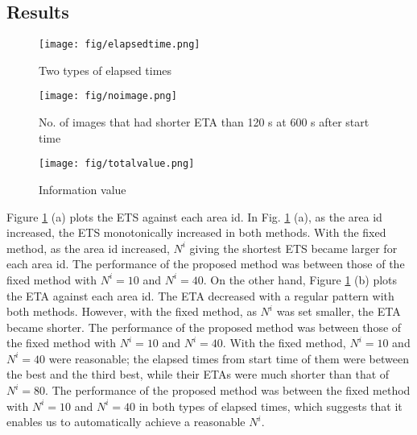 \documentclass{ieeeaccess}
\begin{document}
\subsection{Results}

\begin{figure}[t]
\begin{center}
\texttt{[image: fig/elapsedtime.png]}
\caption{Two types of elapsed times}
\label{elapsed}
\end{center}
\end{figure}

\begin{figure*}[t]
\begin{center}
\texttt{[image: fig/noimage.png]}
\caption{No. of images that had shorter ETA than 120 s at 600 s after start time}
\label{totalnumber}
\end{center}
\end{figure*}

\begin{figure*}[t]
\begin{center}
\texttt{[image: fig/totalvalue.png]}
\caption{Information value}
\label{totalvalue}
\end{center}
\end{figure*}

Figure \ref{elapsed} (a) plots the ETS against each area id. 
In Fig. \ref{elapsed} (a), as the area id increased, the ETS monotonically increased in both methods. With the fixed method, as the area id increased, $N^i$ giving the shortest ETS became larger for each area id. 
The performance of the proposed method was between those of the fixed method with $N^i=10$ and $N^i=40$. 
On the other hand, Figure \ref{elapsed} (b) plots the ETA against each area id.
The ETA decreased with a regular pattern with both methods. However, with the fixed method, as $N^i$ was set smaller, the ETA became shorter. The performance of the proposed method was between those of the fixed method with $N^i=10$ and $N^i=40$. With the fixed method, $N^i=10$ and $N^i=40$ were reasonable; the elapsed times from start time of them were between the best and the third best, while their ETAs were much shorter than that of $N^i=80$. The performance of the proposed method was between the fixed method with $N^i=10$ and $N^i=40$ in both types of elapsed times, which suggests that it enables us to automatically achieve a reasonable $N^i$.
\end{document}
